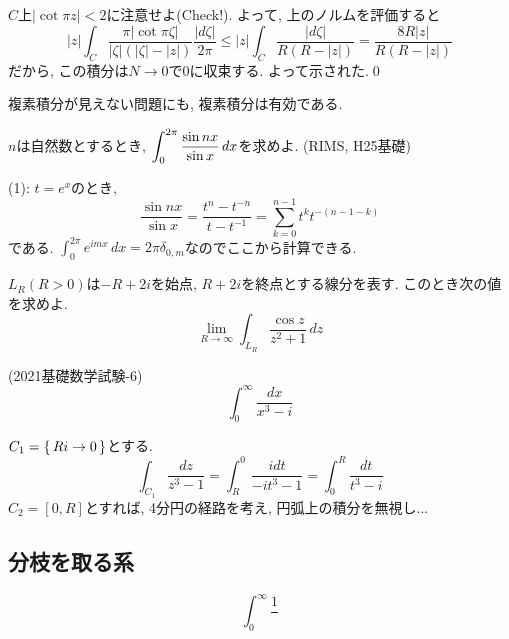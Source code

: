 $C$上$ |\cot{\pi z}| < 2$に注意せよ(Check!). よって, 上のノルムを評価すると
\[|z| \int_{C} \dfrac{\pi |\cot{\pi \zeta}| }{|\zeta|(|\zeta| - |z|)}\dfrac{|d\zeta|}{2\pi} \leq |z| \int_{C}\dfrac{|d\zeta|}{R(R-|z|)} = \dfrac{8R|z|}{R(R-|z|)}\]
だから, この積分は$N\to 0$で$0$に収束する. よって示された.\qed \par
複素積分が見えない問題にも, 複素積分は有効である. 
\begin{egprob}
\ben
\item $n$は自然数とするとき, $\displaystyle\int_{0}^{2\pi} \dfrac{\sin{nx}}{\sin{x}}\, dx$を求めよ. (RIMS, H25基礎)
\een
\end{egprob}
\begin{egans}
(1): $t=e^{x}$のとき,
\[\dfrac{\sin{nx}}{\sin{x}} = \dfrac{t^n - t^{-n}}{t-t^{-1}} = \sum_{k=0}^{n-1} t^{k}t^{-(n-1-k)}\]
である. $\int_{0}^{2\pi} e^{imx}\, dx = 2\pi \delta_{0,m}$なのでここから計算できる.


\end{egans}



\begin{egprob}
$L_R (R>0)$は$-R+2i$を始点, $R+2i$を終点とする線分を表す. このとき次の値を求めよ.
\[\lim_{R\to \infty} \int_{L_R} \dfrac{\cos{z}}{z^2 + 1}\, dz\]
\end{egprob}



\begin{egprob} (2021基礎数学試験-6)
\[\int_{0}^{\infty} \dfrac{dx}{x^3-i}\]
\end{egprob}
\begin{egans}
$C_1 = \set{Ri\to 0}$とする.
\[\int_{C_1}\dfrac{dz}{z^3 - 1} = \int_{R}^{0} \dfrac{idt}{-it^3 - 1} = \int_{0}^{R} \dfrac{dt}{t^3 - i} \]
$C_2 = [0,R]$とすれば, 4分円の経路を考え, 円弧上の積分を無視し...


\end{egans}




\subsection{分枝を取る系}
\begin{egprob}
\[\int_{0}^{\infty} \dfrac{1}{}\]
\end{egprob}








